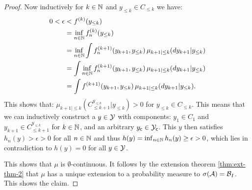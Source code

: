 \begin{Thm}
\begin{proof}
 Now inductively for $k \in \mathbb{N}$ and $y_{\le k} \in C_{\le k}$ we have:
   \begin{align}
   0 < \epsilon &< f^{(k)}(y_{\le k}) \\
                &=\inf_{n \in \mathbb{N}}  f_n^{(k)}(y_{\le k}) \\
                &=\inf_{n \in \mathbb{N}} \int f_n^{(k+1)}(y_{k+1},y_{\le k}) \, \mu_{k+1|\le k}(dy_{k+1}|y_{\le k})\\
                &= \int \inf_{n \in \mathbb{N}} f_n^{(k+1)}(y_{k+1},y_{\le k}) \, \mu_{k+1|\le k}(dy_{k+1}|y_{\le k})\\
                &= \int f^{(k+1)}(y_{k+1},y_{\le k}) \, \mu_{k+1|\le k}(dy_{k+1}|y_{\le k}).
    \end{align}
    This shows that: $\mu_{k+1|\le k}(C_{\le k+1}^{y_{\le k}}|y_{\le k}) > 0$ 
    for $y_{\le k} \in C_{\le k}$.
    This means that we can inductively construct a $y \in \mathcal{Y}$ with components: 
    $y_1 \in C_1$ and $y_{k+1} \in C_{\le k+1}^{y_{\le k}}$ for $k \in \mathbb{N}$, 
    and an arbitrary $y_{\mathsf{c}} \in \mathcal{Y}_{\mathsf{c}}$. 
    This $y$ then satisfies $h_n(y) > \epsilon > 0$ for all $n \in \mathbb{N}$ and thus 
    $h(y) = \inf_{n \in \mathbb{N}} h_n(y) \ge \epsilon > 0$, 
    which lies in contradiction to $h(y) =0$ for all $y \in \mathcal{Y}$.

    This shows that $\mu$ is $\emptyset$-continuous.
    It follows by the extension theorem \ref{thm:ext-thm-2} that $\mu$ has a unique extension to a probability measure to $\sigma(\mathcal{A})=\mathcal{B}_I$.
    This shows the claim.
\end{proof}
\end{Thm}

